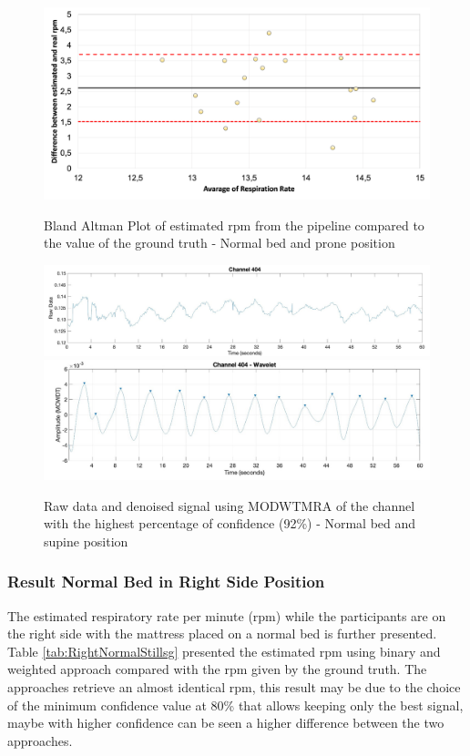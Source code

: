 \begin{figure}[p]
  \centering
  \includegraphics[width=\textwidth]{img/balnd3.png}

  \caption{Bland Altman Plot of estimated rpm from the pipeline compared to the value of the ground truth - Normal bed and prone position}
  \label{fig:baln2}
  \vspace{1.5cm}
  \includegraphics[width=\textwidth]{img/404.jpg}
  \includegraphics[width=\textwidth]{img/404_wave.jpg}
\caption{Raw data and denoised signal using MODWTMRA of the channel with the highest percentage of confidence (92\%) - Normal bed and supine position}
  \label{fig:rec}
\end{figure}

\clearpage
\subsubsection{Result Normal Bed in Right Side Position}   \label{cap:ResultNormalBed4}

The estimated respiratory rate per minute (rpm) while the participants are on the right side with the mattress placed on a normal bed is further presented. Table \ref{tab:RightNormalStillsg} presented the estimated rpm using binary and weighted approach compared with the rpm given by the ground truth. The approaches retrieve an almost identical rpm, this result may be due to the choice of the minimum confidence value at 80\% that allows keeping only the best signal, maybe with higher confidence can be seen a higher difference between the two approaches. 

